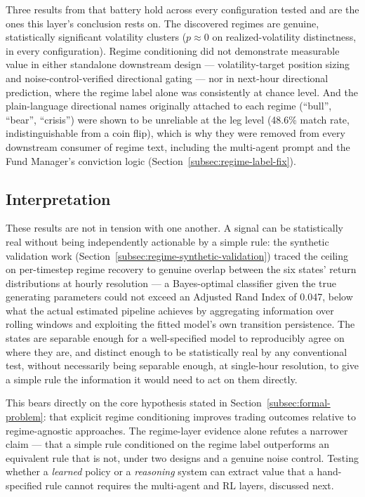 Three results from that battery hold across every configuration tested and are the ones this layer's conclusion rests on. The discovered regimes are genuine, statistically significant volatility clusters ($p\approx0$ on realized-volatility distinctness, in every configuration). Regime conditioning did not demonstrate measurable value in either standalone downstream design --- volatility-target position sizing and noise-control-verified directional gating --- nor in next-hour directional prediction, where the regime label alone was consistently at chance level. And the plain-language directional names originally attached to each regime (``bull'', ``bear'', ``crisis'') were shown to be unreliable at the leg level (48.6\% match rate, indistinguishable from a coin flip), which is why they were removed from every downstream consumer of regime text, including the multi-agent prompt and the Fund Manager's conviction logic (Section~\ref{subsec:regime-label-fix}).

\subsection{Interpretation}
\label{subsec:conclusion-regime-interpretation}

These results are not in tension with one another. A signal can be statistically real without being independently actionable by a simple rule: the synthetic validation work (Section~\ref{subsec:regime-synthetic-validation}) traced the ceiling on per-timestep regime recovery to genuine overlap between the six states' return distributions at hourly resolution --- a Bayes-optimal classifier given the true generating parameters could not exceed an Adjusted Rand Index of 0.047, below what the actual estimated pipeline achieves by aggregating information over rolling windows and exploiting the fitted model's own transition persistence. The states are separable enough for a well-specified model to reproducibly agree on where they are, and distinct enough to be statistically real by any conventional test, without necessarily being separable enough, at single-hour resolution, to give a simple rule the information it would need to act on them directly.

This bears directly on the core hypothesis stated in Section~\ref{subsec:formal-problem}: that explicit regime conditioning improves trading outcomes relative to regime-agnostic approaches. The regime-layer evidence alone refutes a narrower claim --- that a simple rule conditioned on the regime label outperforms an equivalent rule that is not, under two designs and a genuine noise control. Testing whether a \emph{learned} policy or a \emph{reasoning} system can extract value that a hand-specified rule cannot requires the multi-agent and RL layers, discussed next.

